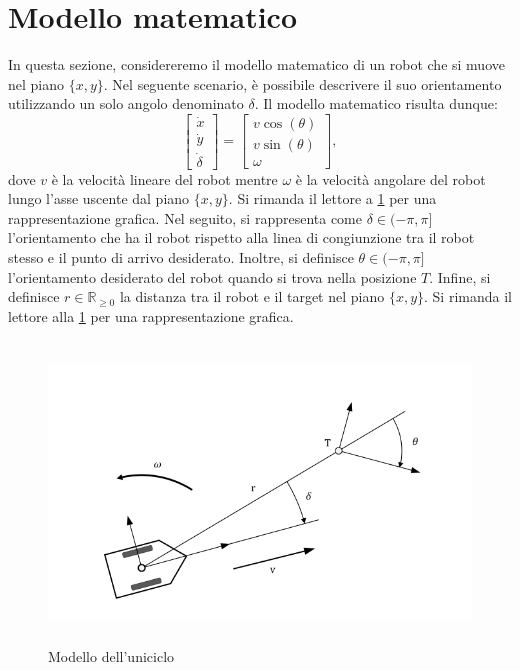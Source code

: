 \documentclass[a4paper,11 pt,oneside]{book}
\theoremstyle{definition}
\begin{document}
\section{Modello matematico}
In questa sezione, considereremo il modello matematico di un robot che si muove nel piano $\{x,y\}$. Nel seguente scenario, è possibile descrivere il suo orientamento utilizzando un solo angolo denominato $\delta$. Il modello matematico risulta dunque:
%
\begin{equation*}
\begin{bmatrix}
\dot{x}\\
\dot{y}\\
\dot{\delta}
\end{bmatrix}=\begin{bmatrix}
v\cos(\theta)\\
v\sin(\theta)\\
\omega
\end{bmatrix},
\label{modello}
\end{equation*}
%
dove $v$ è la velocità lineare del robot mentre $\omega$ è la velocità angolare del robot lungo l'asse uscente dal piano $\{x,y\}$.
Si rimanda il lettore a \ref{uniciclo} per una rappresentazione grafica.
Nel seguito, si rappresenta come $\delta\in(-\pi,\pi]$ l'orientamento che ha il
robot rispetto alla linea di congiunzione tra il robot stesso e il punto di arrivo desiderato. Inoltre, si definisce $\theta\in(-\pi,\pi]$ l'orientamento desiderato del robot quando si trova nella posizione $T$. Infine, si definisce $r\in\mathbb{R}_{\geq 0}$ la distanza tra il robot e il target nel piano $\{x,y\}$. Si rimanda il lettore alla \ref{uniciclo} per una rappresentazione grafica.
\\
\begin{figure}[!htbp]
\includegraphics[width=12cm, height=8cm]{coordinate-sistema.png}
\caption{Modello dell'uniciclo}
\label{uniciclo}
\end{figure}
\end{document}
